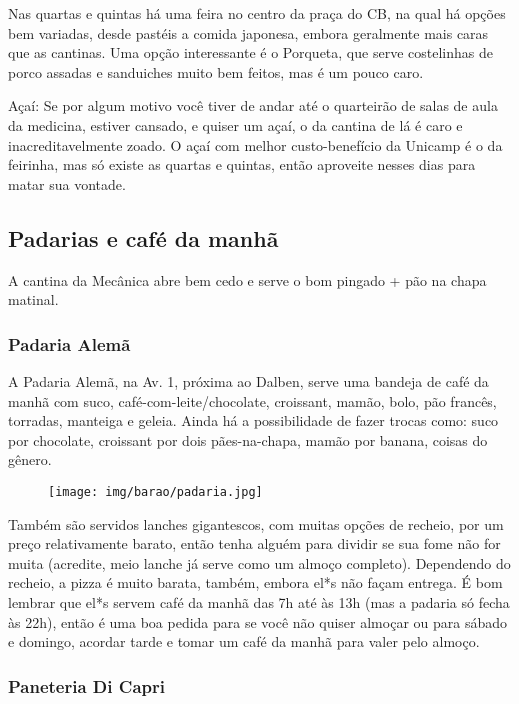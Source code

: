 Nas quartas e quintas há uma feira no centro da praça do CB, na qual há opções bem
variadas, desde pastéis a comida japonesa, embora geralmente mais caras que as
cantinas. Uma opção interessante é o Porqueta, que serve costelinhas de porco
assadas e sanduiches muito bem feitos, mas é um pouco caro.

Açaí: Se por algum motivo você tiver de andar até o quarteirão de salas de aula 
da medicina, estiver cansado, e quiser um açaí, o da cantina de lá é caro e
inacreditavelmente zoado. O açaí com melhor custo-benefício da Unicamp é o da 
feirinha, mas só existe as quartas e quintas, então aproveite nesses dias para
matar sua vontade.


\subsection{Padarias e café da manhã}

A cantina da Mecânica abre bem cedo e serve o bom pingado + pão na chapa
matinal. 

\subsubsection{Padaria Alemã}

A Padaria Alemã, na Av. 1, próxima ao Dalben, serve uma bandeja de café da manhã
com suco, café-com-leite/chocolate, croissant, mamão, bolo, pão francês,
torradas, manteiga e geleia. Ainda há a possibilidade de fazer trocas como: suco
por chocolate, croissant por dois pães-na-chapa, mamão por banana, coisas do
gênero.
\begin{figure}[h!]
    \centering
    \texttt{[image: img/barao/padaria.jpg]}
\end{figure}

Também são servidos lanches gigantescos, com muitas opções de recheio, por um
preço relativamente barato, então tenha alguém para dividir se sua fome não for
muita (acredite, meio lanche já serve como um almoço completo). Dependendo do
recheio, a pizza é muito barata, também, embora el*s não façam entrega. É bom
lembrar que el*s servem café da manhã das 7h até às 13h (mas a padaria só fecha
às 22h), então é uma boa pedida para se você não quiser almoçar ou para sábado e
domingo, acordar tarde e tomar um café da manhã para valer pelo almoço.

\subsubsection{Paneteria Di Capri}

